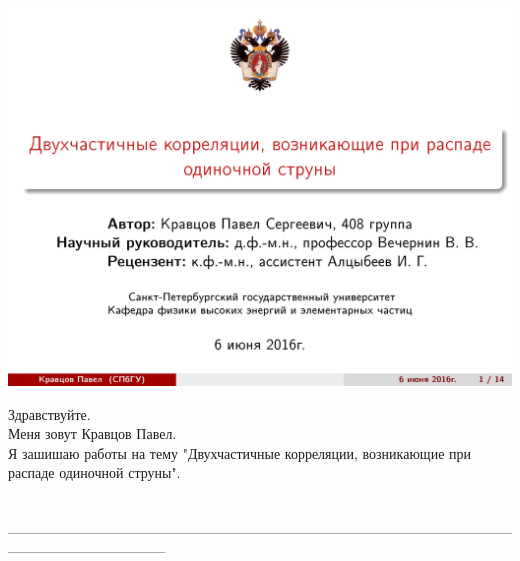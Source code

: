 \documentclass[14pt]{article}
\renewcommand{\line}{\\ \_\_\_\_\_\_\_\_\_\_\_\_\_\_\_\_\_\_\_\_\_\_\_\_\_\_\_\_\_\_\_\_\_\_\_\_\_\_\_\_\_\_\_\_\_\_\_\_\_\_\_\_\_\_\_\_\_\_\_\_\_\_\_ \\ }
\begin{document}
$$$$
$$$$

\begin{minipage}[h]{0.5\linewidth}
\includegraphics[width=1\linewidth]{page-01.jpg}
\end{minipage}
\begin{minipage}[h]{0.45\linewidth}
Здравствуйте.\\
Меня зовут Кравцов Павел. \\
Я зашишаю работы на тему "Двухчастичные корреляции, возникающие при распаде одиночной струны".
\end{minipage}
\line
\end{document}

